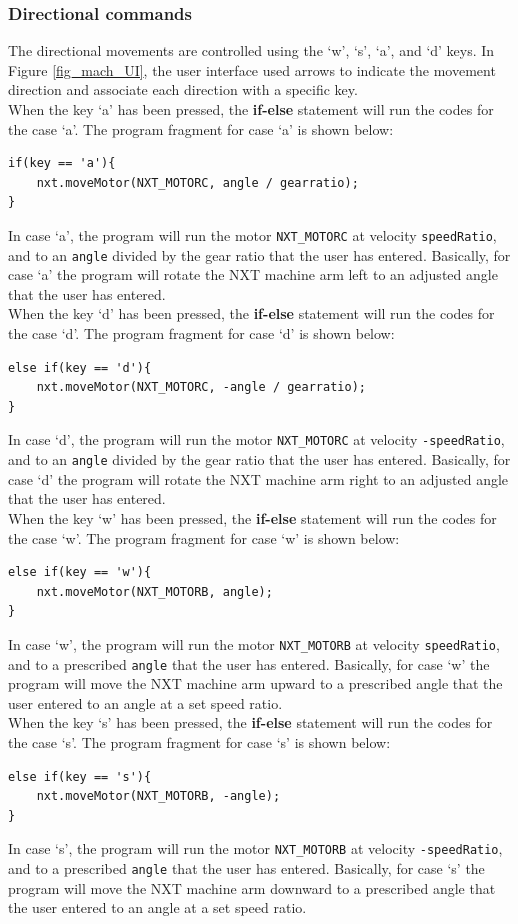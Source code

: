 \documentclass[11pt]{article}
\begin{document}
\subsubsection*{Directional commands}
The directional movements are controlled using the `w', `s', `a', and `d' keys.
In Figure \ref{fig_mach_UI}, the user interface used arrows to indicate the 
movement direction and associate each direction with a specific key.\\
When the key `a' has been pressed, the {\bf if-else} statement will run 
the codes for the case `a'. The program fragment for case `a' is shown below:
\begin{lstlisting}
if(key == 'a'){
    nxt.moveMotor(NXT_MOTORC, angle / gearratio);
}
\end{lstlisting}
In case `a', the program will run the motor {\tt NXT\_MOTORC} at velocity 
{\tt speedRatio}, and to an {\tt angle} divided by the gear ratio that the user 
has entered. Basically, for case `a' the program will rotate the NXT machine arm 
left to an adjusted angle that the user has entered.\\
When the key `d' has been pressed, the {\bf if-else} statement will run 
the codes for the case `d'. The program fragment for case `d' is shown below:
\begin{lstlisting}
else if(key == 'd'){
    nxt.moveMotor(NXT_MOTORC, -angle / gearratio);
}
\end{lstlisting}
In case `d', the program will run the motor {\tt NXT\_MOTORC} at velocity 
{\tt -speedRatio}, and to an {\tt angle} divided by the gear ratio that the user 
has entered. Basically, for case `d' the program will rotate the NXT machine arm 
right to an adjusted angle that the user has entered.\\
When the key `w' has been pressed, the {\bf if-else} statement will run 
the codes for the case `w'. The program fragment for case `w' is shown below:
\begin{lstlisting}
else if(key == 'w'){
    nxt.moveMotor(NXT_MOTORB, angle);
}
\end{lstlisting}
In case `w', the program will run the motor {\tt NXT\_MOTORB} at velocity 
{\tt speedRatio}, and to a prescribed {\tt angle} that the user has entered. 
Basically, for case `w' the program will move the NXT machine arm upward to a 
prescribed angle that the user entered to an angle at a set speed ratio.\\
When the key `s' has been pressed, the {\bf if-else} statement will run 
the codes for the case `s'. The program fragment for case `s' is shown below:
\begin{lstlisting}
else if(key == 's'){
    nxt.moveMotor(NXT_MOTORB, -angle);
}
\end{lstlisting}
In case `s', the program will run the motor {\tt NXT\_MOTORB} at velocity 
{\tt -speedRatio}, and to a prescribed {\tt angle} that the user has entered. 
Basically, for case `s' the program will move the NXT machine arm downward to 
a prescribed angle that the user entered to an angle at a set speed ratio.\\
\end{document}
